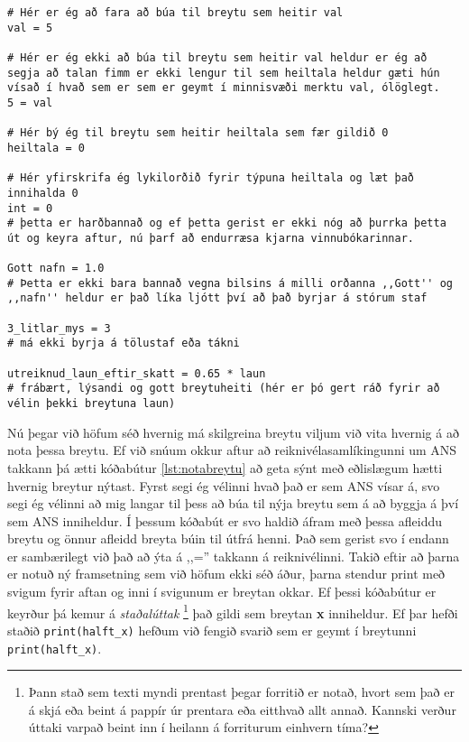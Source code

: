 \begin{lstlisting}[caption=Dæmi um gildisvetingar\, réttar og rangar]
# Hér er ég að fara að búa til breytu sem heitir val
val = 5

# Hér er ég ekki að búa til breytu sem heitir val heldur er ég að segja að talan fimm er ekki lengur til sem heiltala heldur gæti hún vísað í hvað sem er sem er geymt í minnisvæði merktu val, ólöglegt.
5 = val

# Hér bý ég til breytu sem heitir heiltala sem fær gildið 0
heiltala = 0

# Hér yfirskrifa ég lykilorðið fyrir týpuna heiltala og læt það innihalda 0
int = 0
# þetta er harðbannað og ef þetta gerist er ekki nóg að þurrka þetta út og keyra aftur, nú þarf að endurræsa kjarna vinnubókarinnar.

Gott nafn = 1.0
# Þetta er ekki bara bannað vegna bilsins á milli orðanna ,,Gott'' og ,,nafn'' heldur er það líka ljótt því að það byrjar á stórum staf

3_litlar_mys = 3
# má ekki byrja á tölustaf eða tákni

utreiknud_laun_eftir_skatt = 0.65 * laun
# frábært, lýsandi og gott breytuheiti (hér er þó gert ráð fyrir að vélin þekki breytuna laun)
\end{lstlisting}

Nú þegar við höfum séð hvernig má skilgreina breytu viljum við vita hvernig á að nota þessa breytu.
Ef við snúum okkur aftur að reiknivélasamlíkingunni um ANS takkann þá ætti kóðabútur \ref{lst:notabreytu} að geta sýnt með eðlislægum hætti hvernig breytur nýtast.
Fyrst segi ég vélinni hvað það er sem ANS vísar á, svo segi ég vélinni að mig langar til þess að búa til nýja breytu sem á að byggja á því sem ANS inniheldur.
Í þessum kóðabút er svo haldið áfram með þessa afleiddu breytu og önnur afleidd breyta búin til útfrá henni.
Það sem gerist svo í endann er sambærilegt við það að ýta á ,,='' takkann á reiknivélinni.
Takið eftir að þarna er notuð ný framsetning sem við höfum ekki séð áður, þarna stendur print með svigum fyrir aftan og inni í svigunum er breytan okkar.
Ef þessi kóðabútur er keyrður þá kemur á \textit{staðalúttak} 
\footnote{Þann stað sem texti myndi prentast þegar forritið er notað, hvort sem það er á skjá eða beint á pappír úr prentara eða eitthvað allt annað. Kannski verður úttaki varpað beint inn í heilann á forriturum einhvern tíma?} 
það gildi sem breytan \textbf{x} inniheldur.
Ef þar hefði staðið \texttt{print(halft\_x)} hefðum við fengið svarið sem er geymt í breytunni \texttt{print(halft\_x)}.

